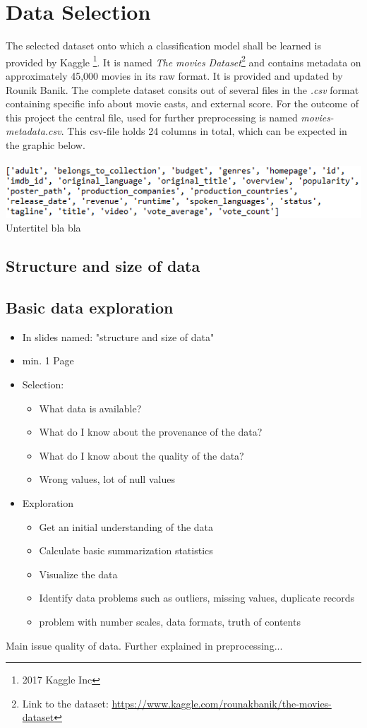 \chapter{Data Selection}
\label{cha:data_selection}
The selected dataset onto which a classification model shall be learned is provided by Kaggle \footnote{2017 Kaggle Inc}. It is named \textit{The movies Dataset}\footnote{Link to the dataset: \hyperref[https://www.kaggle.com/rounakbanik/the-movies-dataset]{https://www.kaggle.com/rounakbanik/the-movies-dataset}} and contains metadata on approximately 45,000 movies in its raw format. It is provided and updated by Rounik Banik. The complete dataset consits out of several files in the \textit{.csv} format containing specific info about movie casts, and external score. For the outcome of this project the central file, used for further preprocessing is named \textit{movies-metadata.csv}. This csv-file holds 24 columns in total, which can be expected in the graphic below.\\\\
\includegraphics[width=\textwidth]{images/Raw_dataset_headers.png}
Untertitel bla bla

\section{Structure and size of data}

\section{Basic data exploration}

\begin{itemize}
	\item In slides named: "structure and size of data"
	\item min. 1 Page
	\item Selection: 
	\begin{itemize}
		\item What data is available?
		\item What do I know about the provenance of the data?
		\item What do I know about the quality of the data?
		\item Wrong values, lot of null values
	\end{itemize}
	\item Exploration
	\begin{itemize}
		\item Get an initial understanding of the data
		\item Calculate basic summarization statistics
		\item Visualize the data
		\item Identify data problems such as outliers, missing values, duplicate records
		\item problem with number scales, data formats, truth of contents
	\end{itemize}
\end{itemize}

Main issue quality of data. Further explained in preprocessing...
